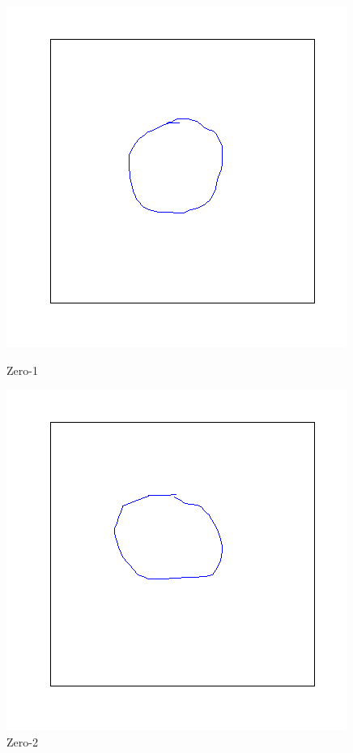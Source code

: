 \documentclass[a4paper, 10pt]{article}
\begin{document}
\begin{figure}[ht]
\begin{minipage}[b]{0.45\linewidth}
\centering
\includegraphics[width=\textwidth]{figs/0-1}
\caption{Zero-1}
\label{fig:figure1}
\end{minipage}
\hspace{0.5cm}
\begin{minipage}[b]{0.45\linewidth}
\centering
\includegraphics[width=\textwidth]{figs/0-2}
\caption{Zero-2}
\label{fig:figure2}
\end{minipage}
\end{figure}
\end{document}
